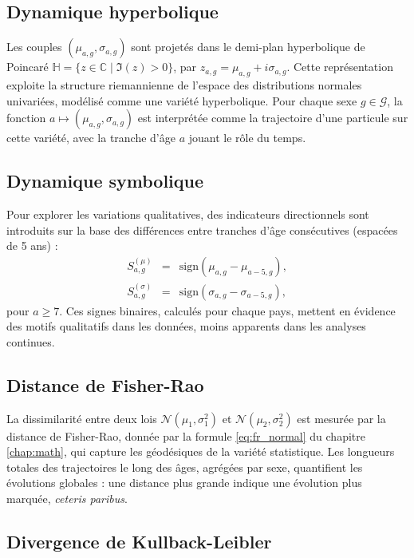 \subsection{Dynamique hyperbolique}

Les couples $(\mu_{a,g}, \sigma_{a,g})$ sont projetés dans le demi-plan hyperbolique de Poincaré $\mathbb{H} = \{ z \in \mathbb{C} \mid \Im(z) > 0 \}$, par $z_{a,g} = \mu_{a,g} + i \sigma_{a,g}$. Cette représentation exploite la structure riemannienne de l'espace des distributions normales univariées, modélisé comme une variété hyperbolique. Pour chaque sexe $g \in \mathcal{G}$, la fonction $a \mapsto (\mu_{a,g}, \sigma_{a,g})$ est interprétée comme la trajectoire d'une particule sur cette variété, avec la tranche d'âge $a$ jouant le rôle du temps.

\subsection{Dynamique symbolique}

Pour explorer les variations qualitatives, des indicateurs directionnels sont introduits sur la base des différences entre tranches d'âge consécutives (espacées de 5 ans) :
\begin{eqnarray}
	S_{a,g}^{(\mu)} &=& \mathrm{sign}(\mu_{a,g} - \mu_{a-5,g}), \\
	S_{a,g}^{(\sigma)} &=& \mathrm{sign}(\sigma_{a,g} - \sigma_{a-5,g}),
\end{eqnarray}
pour $a \geq 7$. Ces signes binaires, calculés pour chaque pays, mettent en évidence des motifs qualitatifs dans les données, moins apparents dans les analyses continues.

\subsection{Distance de Fisher-Rao}

La dissimilarité entre deux lois $\mathcal{N}(\mu_1, \sigma_1^2)$ et $\mathcal{N}(\mu_2, \sigma_2^2)$ est mesurée par la distance de Fisher-Rao, donnée par la formule \eqref{eq:fr_normal} du chapitre \ref{chap:math}, qui capture les géodésiques de la variété statistique. Les longueurs totales des trajectoires le long des âges, agrégées par sexe, quantifient les évolutions globales : une distance plus grande indique une évolution plus marquée, \emph{ceteris paribus}.

\subsection{Divergence de Kullback-Leibler}

